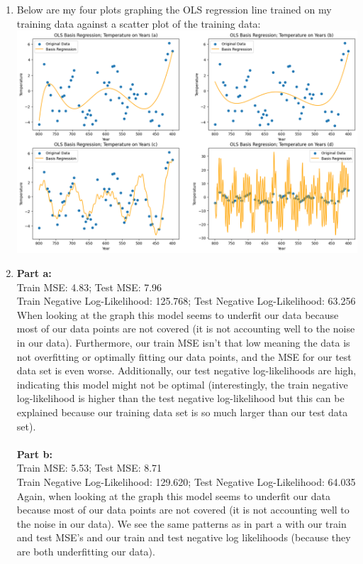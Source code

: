 \documentclass[submit]{harvardml}
\begin{document}
\begin{enumerate}
    \item Below are my four plots graphing the OLS regression line trained on my training data against a scatter plot of the training data:\\
    \includegraphics[scale=0.5]{hw1/linearRegressionGraph.png}\\
    \item
    \textbf{Part a:}\\
    Train MSE: 4.83; Test MSE: 7.96 \\
    Train Negative Log-Likelihood: 125.768; Test Negative Log-Likelihood: 63.256\\
    When looking at the graph this model seems to underfit our data because most of our data points are not covered (it is not accounting well to the noise in our data). Furthermore, our train MSE isn't that low meaning the data is not overfitting or optimally fitting our data points, and the MSE for our test data set is even worse. Additionally, our test negative log-likelihoods are high, indicating this model might not be optimal (interestingly, the train negative log-likelihood is higher than the test negative log-likelihood but this can be explained because our training data set is so much larger than our test data set).\\
    \\
    \textbf{Part b:}\\
    Train MSE: 5.53; Test MSE: 8.71 \\
    Train Negative Log-Likelihood: 129.620; Test Negative Log-Likelihood: 64.035 \\
    Again, when looking at the graph this model seems to underfit our data because most of our data points are not covered (it is not accounting well to the noise in our data). We see the same patterns as in part a with our train and test MSE's and our train and test negative log likelihoods (because they are both underfitting our data). \\

\end{enumerate}
\end{document}
